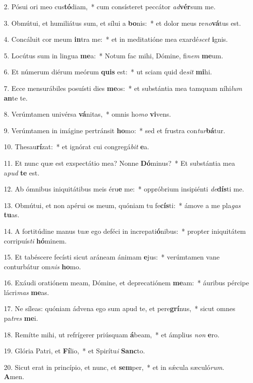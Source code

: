 2. Pósui ori meo cus\textbf{tó}diam,~*  cum consísteret peccátor \textit{ad}\textbf{vér}sum me.\

3. Obmútui, et humiliátus sum, et sílui a \textbf{bo}nis:~*  et dolor meus re\textit{no}\textbf{vá}tus est.\

4. Concáluit cor meum \textbf{in}tra me:~*  et in meditatióne mea exardé\textit{scet} \textbf{i}gnis.\

5. Locútus sum in lingua \textbf{me}a:~*  Notum fac mihi, Dómine, fi\textit{nem} \textbf{me}um.\

6. Et númerum diérum meórum \textbf{quis} est:~*  ut sciam quid de\textit{sit} \textbf{mi}hi.\

7. Ecce mensurábiles posuísti dies \textbf{me}os:~*  et substántia mea tamquam níhi\textit{lum} \textbf{an}te te.\

8. Verúmtamen univérsa \textbf{vá}nitas,~*  omnis ho\textit{mo} \textbf{vi}vens.\

9. Verúmtamen in imágine pertránsit \textbf{ho}mo:~*  sed et frustra con\textit{tur}\textbf{bá}tur.\

10. Thesau\textbf{rí}zat:~*  et ignórat cui congregá\textit{bit} \textbf{e}a.\

11. Et nunc quæ est exspectátio mea? Nonne \textbf{Dó}minus?~*  Et substántia mea a\textit{pud} \textbf{te} est.\

12. Ab ómnibus iniquitátibus meis éru\textbf{e} me:~*  oppróbrium insipiénti \textit{de}\textbf{dís}ti me.\

13. Obmútui, et non apérui os meum, quóniam tu fe\textbf{cís}ti:~*  ámove a me pla\textit{gas} \textbf{tu}as.\

14. A fortitúdine manus tuæ ego deféci in increpati\textbf{ó}nibus:~*  propter iniquitátem corripuís\textit{ti} \textbf{hó}minem.\

15. Et tabéscere fecísti sicut aráneam ánimam \textbf{e}jus:~*  verúmtamen vane conturbátur om\textit{nis} \textbf{ho}mo.\

16. Exáudi oratiónem meam, Dómine, et deprecatiónem \textbf{me}am:~*  áuribus pércipe lácri\textit{mas} \textbf{me}as.\

17. Ne síleas: quóniam ádvena ego sum apud te, et pere\textbf{grí}nus,~*  sicut omnes pa\textit{tres} \textbf{me}i.\

18. Remítte mihi, ut refrígerer priúsquam \textbf{á}beam,~*  et ámplius \textit{non} \textbf{e}ro.\

19. Glória Patri, et \textbf{Fí}lio,~*  et Spirítu\textit{i} \textbf{Sanc}to.\

20. Sicut erat in princípio, et nunc, et \textbf{sem}per,~*  et in sǽcula sæculó\textit{rum}. \textbf{A}men.\

